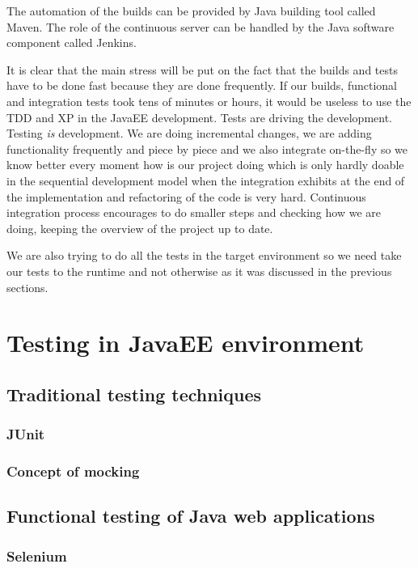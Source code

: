 \documentclass[12pt,final,oneside]{fithesis}
\begin{document}
The automation of the builds can be provided by Java building tool called Maven. The role of the continuous server can be handled by the Java software component called Jenkins.

It is clear that the main stress will be put on the fact that the builds and tests have to be done fast because they are done frequently. If our builds, functional and integration tests took tens of minutes or hours, it would be useless to use the TDD and XP in the JavaEE development. Tests are driving the development. Testing \emph{is} development. We are doing incremental changes, we are adding functionality frequently and piece by piece and we also integrate on-the-fly so we know better every moment how is our project doing which is only hardly doable in the sequential development model when the integration exhibits at the end of the implementation and refactoring of the code is very hard. Continuous integration process encourages to do smaller steps and checking how we are doing, keeping the overview of the project up to date.

We are also trying to do all the tests in the target environment so we need take our tests to the runtime and not otherwise as it was discussed in the previous sections.

\chapter{Testing in JavaEE environment}

	\section{Traditional testing techniques}
		\subsection{JUnit}
		
		\subsection{Concept of mocking}

	\section{Functional testing of Java web applications}
		\subsection{Selenium}
\end{document}
